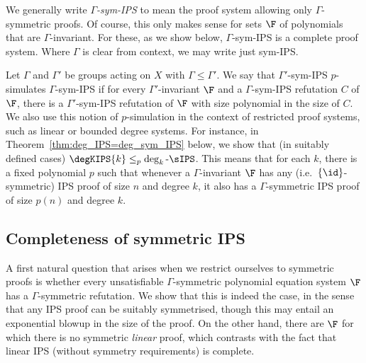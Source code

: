 \documentclass[a4paper,UKenglish,cleveref, autoref, thm-restate]{lipics-v2021}
\begin{document}
We generally write \emph{$\Gamma$-sym-IPS} to mean the proof system allowing only $\Gamma$-symmetric proofs.  Of course, this only makes sense for sets $\F$ of polynomials that are $\Gamma$-invariant.  For these, as we show below, $\Gamma$-sym-IPS is a complete proof system.  Where $\Gamma$ is clear from context, we may write just sym-IPS.

Let $\Gamma$ and $\Gamma'$ be groups acting on $X$ with $\Gamma \leq \Gamma'$.  We say that $\Gamma'$-sym-IPS $p$-simulates $\Gamma$-sym-IPS if for every $\Gamma'$-invariant $\F$ and a $\Gamma$-sym-IPS refutation $C$ of $\F$, there is a $\Gamma'$-sym-IPS refutation of $\F$ with size polynomial in the size of $C$.  We also use this notion of $p$-simulation in the context of restricted proof systems, such as linear or bounded degree systems.  For instance, in Theorem~\ref{thm:deg_IPS=deg_sym_IPS} below, we show that (in suitably defined cases) $\degKIPS{k}  \leq_p \deg_k\text{-}\sIPS$.  This means that for each $k$, there is a fixed polynomial $p$ such that whenever a $\Gamma$-invariant $\F$ has any (i.e.\ $\{\id\}$-symmetric) IPS proof of size $n$ and degree $k$, it also has a $\Gamma$-symmetric IPS proof of size $p(n)$ and degree $k$.


\subsection{Completeness of  symmetric IPS}

A first natural question that arises when we restrict ourselves to symmetric proofs is whether every unsatisfiable $\Gamma$-symmetric polynomial equation system $\F$ has a $\Gamma$-symmetric refutation.  We show that this is indeed the case, in the sense that any IPS proof can be suitably symmetrised, though this may entail an exponential blowup in the size of the proof. On the other hand, there are $\F$ for which there is no symmetric \emph{linear} proof, which contrasts with the fact that linear IPS (without symmetry requirements) is complete.
\end{document}
